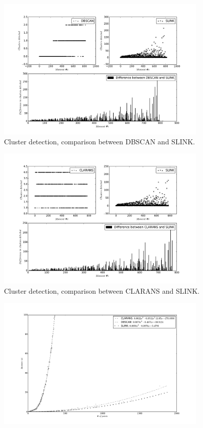 \begin{figure}
    \centering
    \includegraphics[width=0.9\textwidth]{plots/dbscan_vs_slink.pdf}
    {Cluster detection, comparison between DBSCAN and SLINK. }
\end{figure}

\begin{figure}
    \centering
    \includegraphics[width=0.9\textwidth]{plots/clarans_vs_slink.pdf}
    {Cluster detection, comparison between CLARANS and SLINK. }
\end{figure}

\begin{figure}
    \centering
    \includegraphics[width=0.9\textwidth]{plots/time_trendlines.pdf}
\end{figure}